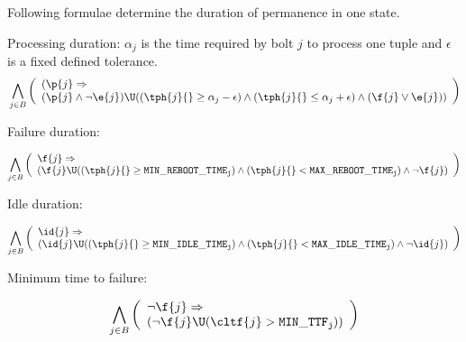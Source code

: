 Following formulae determine the duration of permanence in one state.

Processing duration: $\alpha_j$ is the time required by bolt $j$ to process one tuple and $\epsilon$ is a fixed defined tolerance.
\begin{align*}
%
%
&\bigwedge_{
	\begin{subarray}{c}
	j \in B\\
	\end{subarray}
}
\left( \begin{array}{l}
(\p{j} \Rightarrow \\
(\p{j} \land \lnot \e{j}) \U (( \tph{j}{} \geq \alpha_{j} - \epsilon) \land ( \tph{j}{} \leq \alpha_{j} + \epsilon) \land (\f{j} \lor \e{j}) )
\end{array} \right)\\
\end{align*}

Failure duration:

\begin{align*}
%
\bigwedge_{
	\begin{subarray}{c}
	j \in B\\
	\end{subarray}
}
\left( \begin{array}{l}
\f{j} \Rightarrow \\
(\f{j}  \U (( \tph{j}{} \geq \mathtt{MIN\_REBOOT\_TIME_j}) \land ( \tph{j}{} < \mathtt{MAX\_REBOOT\_TIME_j}) \land \lnot \f{j})
\end{array} \right)\\ 
%
%
\end{align*}

Idle duration:

\begin{align*}
%
\bigwedge_{
	\begin{subarray}{c}
	j \in B\\
	\end{subarray}
}
\left( \begin{array}{l}
\id{j}  \Rightarrow \\
(\id{j}  \U (( \tph{j}{} \geq \mathtt{MIN\_IDLE\_TIME_j}) \land ( \tph{j}{} < \mathtt{MAX\_IDLE\_TIME_j}) \land \lnot \id{j})
\end{array} \right)\\ 
%
%
\end{align*}

Minimum time to failure:

\begin{align*}
%
\bigwedge_{
	\begin{subarray}{c}
	j \in B\\
	\end{subarray}
}
\left( \begin{array}{l}
\lnot \f{j} \Rightarrow \\
(\lnot \f{j}  \U ( \cltf{j} > \mathtt{MIN\_TTF_j}))
\end{array} \right)\\ 
%
%
\end{align*}


